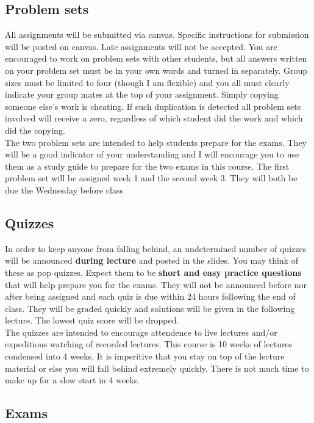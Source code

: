 \documentclass[11pt]{article}
\begin{document}
	\subsection*{Problem sets}

All assignments will be submitted via canvas. Specific instructions for submission will be posted on canvas. Late assignments will not be accepted. You are encouraged to work on problem sets with other students, but all answers written on your problem set must be in your own words and turned in separately. Group sizes must be limited to four (though I am flexible) and you all must clearly indicate your group mates at the top of your assignment. Simply copying someone else’s work is cheating. If such duplication is detected all problem sets involved will receive a zero, regardless of which student did the work and which did the copying. \\

The two problem sets are intended to help students prepare for the exams. They will be a good indicator of your understanding and I will encourage you to use them as a study guide to prepare for the two exams in this course. The first problem set will be assigned week 1 and the second week 3. They will both be due the Wednesday before class 
	
	\subsection*{Quizzes}

		In order to keep anyone from falling behind, an undetermined number of quizzes will be announced \textbf{during lecture} and posted in the slides. You may think of these as pop quizzes. Expect them to be \textbf{short and easy practice questions} that will help prepare you for the exams. They will not be announced before nor after being assigned and each quiz is due within 24 hours following the end of class. They will be graded quickly and solutions will be given in the following lecture. The lowest quiz score will be dropped. \\
		
		The quizzes are intended to encourage attendence to live lectures and/or expeditious watching of recorded lectures. This course is 10 weeks of lectures condensed into 4 weeks. It is imperitive that you stay on top of the lecture material or else you will fall behind extremely quickly. There is not much time to make up for a slow start in 4 weeks.

	\subsection*{Exams}
	
\end{document}
